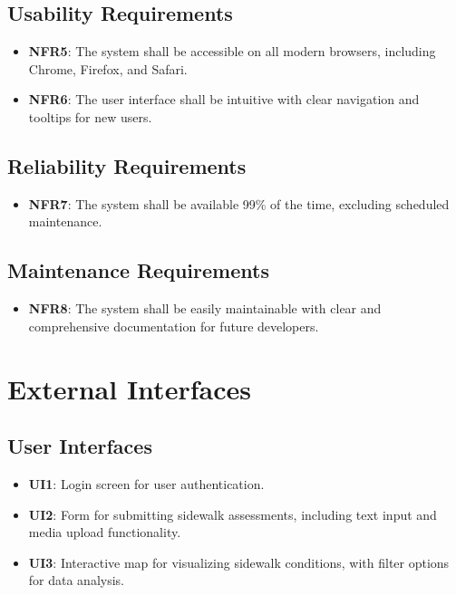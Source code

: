 \documentclass[a4paper,12pt]{article}
\begin{document}
\subsection{Usability Requirements}
\begin{itemize}
    \item \textbf{NFR5}: The system shall be accessible on all modern browsers, including Chrome, Firefox, and Safari.
    \item \textbf{NFR6}: The user interface shall be intuitive with clear navigation and tooltips for new users.
\end{itemize}

\subsection{Reliability Requirements}
\begin{itemize}
    \item \textbf{NFR7}: The system shall be available 99\% of the time, excluding scheduled maintenance.
\end{itemize}

\subsection{Maintenance Requirements}
\begin{itemize}
    \item \textbf{NFR8}: The system shall be easily maintainable with clear and comprehensive documentation for future developers.
\end{itemize}

\newpage
\section{External Interfaces}

\subsection{User Interfaces}
\begin{itemize}
    \item \textbf{UI1}: Login screen for user authentication.
    \item \textbf{UI2}: Form for submitting sidewalk assessments, including text input and media upload functionality.
    \item \textbf{UI3}: Interactive map for visualizing sidewalk conditions, with filter options for data analysis.
\end{itemize}
\end{document}
